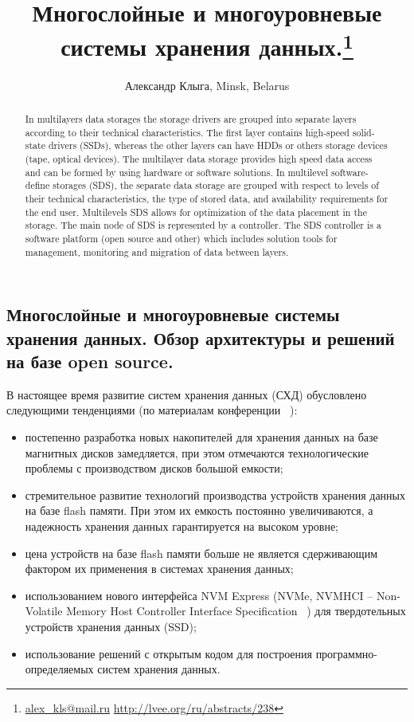 \documentclass[10pt, a5paper]{article}
\begin{document}
\title{Многослойные и многоуровневые системы хранения данных.\footnote{\url{alex_kls@mail.ru} \url{http://lvee.org/ru/abstracts/238}}}
\author{Александр Клыга, Minsk, Belarus}
\maketitle
\begin{abstract}
In multilayers data storages the storage drivers are grouped into
separate layers according to their technical characteristics. The first layer contains high-speed solid-state drivers (SSDs), whereas the other layers can have HDDs or others storage devices (tape, optical devices). The multilayer data storage provides high speed data access and can be formed by using hardware or software solutions. In multilevel software-define storages (SDS), the separate data storage are grouped with respect to levels of their technical characteristics, the type of stored data, and availability requirements for the end user. Multilevels SDS allows for optimization of the data placement in the storage. The main node of SDS is represented by a controller. The SDS controller is a software platform (open source and other) which includes solution tools for management, monitoring and migration of data between layers.
\end{abstract}
\subsection*{Многослойные и многоуровневые системы хранения данных. Обзор архитектуры и решений на базе open source.}

В настоящее время развитие систем хранения данных (СХД) обусловлено следующими тенденциями (по материалам конференции ~\cite{kliga-1}):

\begin{itemize}
  \item постепенно разработка новых накопителей для хранения данных на базе магнитных дисков замедляется, при этом отмечаются технологические проблемы с производством дисков большой емкости;
  \item стремительное развитие технологий производства устройств хранения данных на базе flash памяти. При этом их емкость  постоянно увеличиваются, а надежность хранения данных гарантируется на высоком уровне;
  \item цена устройств на базе flash памяти больше не является сдерживающим фактором их применения в системах хранения данных;
  \item использованием нового интерфейса NVM Express (NVMe, \linebreak NVMHCI -- Non-Volatile Memory Host Controller Interface \linebreak Specification ~\cite{kliga-2}) для твердотельных устройств хранения данных (SSD);
  \item использование решений с открытым кодом для  построения программно-определяемых систем хранения данных.
\end{itemize}
\end{document}
